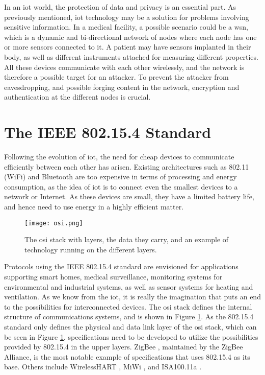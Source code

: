 In an \gls{iot} world, the protection of data and privacy is an essential part. As previously mentioned, \gls{iot} technology may be a solution for problems involving sensitive information. In a medical facility, a possible scenario could be a \gls{wsn}, which is a dynamic and bi-directional network of nodes where each node has one or more sensors connected to it. A patient may have sensors implanted in their body, as well as different instruments attached for measuring different properties. All these devices communicate with each other wirelessly, and the network is therefore a possible target for an attacker. To prevent the attacker from eavesdropping, and possible forging content in the network, encryption and authentication at the different nodes is crucial.








\section{The IEEE 802.15.4 Standard}

Following the evolution of \gls{iot}, the need for cheap devices to communicate efficiently between each other has arisen. Existing architectures such as 802.11 (WiFi) and Bluetooth are too expensive in terms of processing and energy consumption, as the idea of \gls{iot} is to connect even the smallest devices to a network or Internet. As these devices are small, they have a limited battery life, and hence need to use energy in a highly efficient matter.

\begin{figure}[h]
	\centering
	\texttt{[image: osi.png]}
	\caption{The \gls{osi} stack with layers, the data they carry, and an example of technology running on the different layers.}
	\label{fig:osi}
\end{figure}

Protocols using the IEEE 802.15.4 standard are envisioned for applications supporting smart homes, medical surveillance, monitoring systems for environmental and industrial systems, as well as sensor systems for heating and ventilation. As we know from the \gls{iot}, it is really the imagination that puts an end to the possibilities for interconnected devices. The \gls{osi} stack defines the internal structure of communications systems, and is shown in Figure \ref{fig:osi}. As the 802.15.4 standard only defines the physical and data link layer of the \gls{osi} stack, which can be seen in Figure \ref{fig:osi}, specifications need to be developed to utilize the possibilities provided by 802.15.4 in the upper layers. ZigBee \cite{zigbee}, maintained by the ZigBee Alliance, is the most notable example of specifications that uses 802.15.4 as its base. Others include WirelessHART \cite{wirelesshart}, MiWi \cite{miwi}, and ISA100.11a \cite{isa100}.

